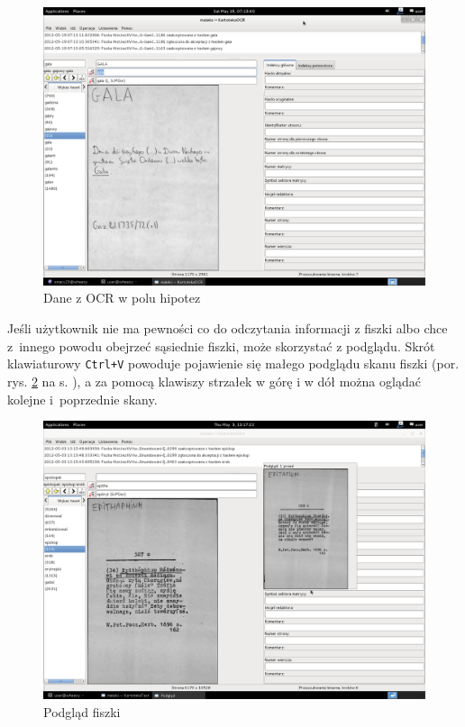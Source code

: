 \documentclass[12pt,oneside,notitlepage,titleauthor]{mwart}%
\begin{document}
\begin{figure}[h]
\includegraphics[scale=0.3]{OCR.png}
\caption{Dane z OCR w polu hipotez}
\label{ocr}
\end{figure}

Jeśli użytkownik nie ma pewności co do odczytania informacji z fiszki albo  chce z~innego powodu obejrzeć sąsiednie fiszki, może skorzystać z podglądu. Skrót klawiaturowy \texttt{Ctrl+V} powoduje pojawienie się małego podglądu skanu fiszki (por. rys. \ref{07podglad} na s. \pageref{07podglad}), a za pomocą klawiszy strzałek w górę i w dół można oglądać kolejne i~poprzednie skany.

\begin{figure}[h]
\includegraphics[scale=0.3]{07podglad.png}
\caption{Podgląd fiszki}
\label{07podglad}
\end{figure}
\end{document}
